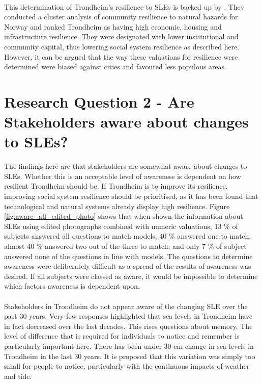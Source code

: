 \paragraph{}
This determination of Trondheim's resilience to SLEs is backed up by \cite{opach_seeking_2020}. They conducted a cluster analysis of community resilience to natural hazards for Norway and ranked Trondheim as having high economic, housing and infrastructure resilience. They were designated with lower institutional and community capital, thus lowering social system resilience as described here. However, it can be argued that the way these valuations for resilience were determined were biased against cities and favoured less populous areas.



\section{Research Question 2 - Are Stakeholders aware about changes to SLEs?} \label{RQ2 - findings}

The findings here are that stakeholders are somewhat aware about changes to SLEs. Whether this is an acceptable level of awareness is dependent on how resilient Trondheim should be. If Trondheim is to improve its resilience, improving social system resilience should be prioritised, as it has been found that technological and natural systems already display high resilience. Figure \ref{fig:aware_all_edited_photo} shows that when shown the information about SLEs using edited photographs combined with numeric valuations, 13 \% of subjects answered all questions to match \cite{kartverket_se_2021} models; 40 \% answered one to match; almost 40 \% answered two out of the three to match; and only 7 \% of subject answered none of the questions in line with \cite{kartverket_se_2021} models. The questions to determine awareness were deliberately difficult as a spread of the results of awareness was desired. If all subjects were classed as aware, it would be impossible to determine which factors awareness is dependent upon. 
\paragraph{}
Stakeholders in Trondheim do not appear aware of the changing SLE over the past 30 years. Very few responses highlighted that sea levels in Trondheim have in fact decreased over the last decades. This rises questions about memory. The level of difference that is required for individuals to notice and remember is particularly important here. There has been under 30 cm change in sea levels in Trondheim in the last 30 years. It is proposed that this variation was simply too small for people to notice, particularly with the continuous impacts of weather and tide. 
